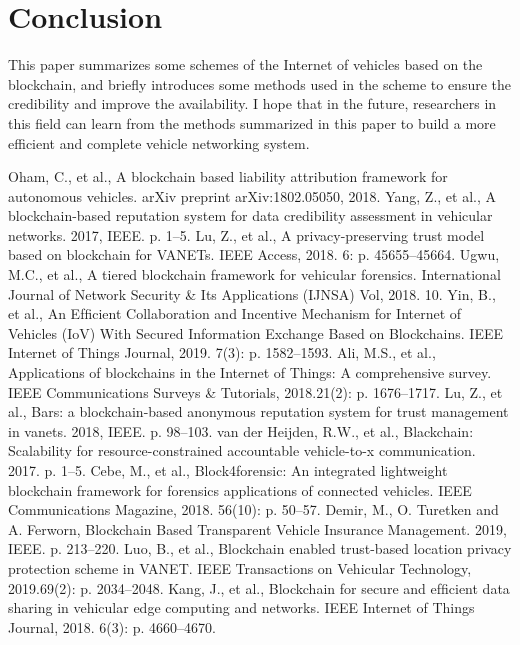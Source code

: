 \section{Conclusion}\label{sec:conclusion}
This paper summarizes some schemes of the Internet of vehicles based on the blockchain, and briefly introduces some methods used in the scheme to ensure the credibility and improve the availability. I hope that in the future, researchers in this field can learn from the methods summarized in this paper to build a more efficient and complete vehicle networking system.
\begin{thebibliography}{99} 
 Oham, C., et al., A blockchain based liability attribution framework for autonomous vehicles. arXiv preprint arXiv:1802.05050, 2018.
 Yang, Z., et al., A blockchain-based reputation system for data credibility assessment in vehicular networks. 2017, IEEE. p. 1–5.
 Lu, Z., et al., A privacy-preserving trust model based on blockchain for VANETs. IEEE Access, 2018. 6: p. 45655–45664.
 Ugwu, M.C., et al., A tiered blockchain framework for vehicular forensics. International Journal of Network Security \& Its Applications (IJNSA)
Vol, 2018. 10.
 Yin, B., et al., An Efﬁcient Collaboration and Incentive Mechanism for Internet of Vehicles (IoV) With Secured Information Exchange Based on Blockchains. IEEE Internet of Things Journal, 2019. 7(3): p. 1582–1593.
 Ali, M.S., et al., Applications of blockchains in the Internet of Things: A comprehensive survey. IEEE Communications Surveys \& Tutorials, 2018.21(2): p. 1676–1717.
 Lu, Z., et al., Bars: a blockchain-based anonymous reputation system for trust management in vanets. 2018, IEEE. p. 98–103.
 van der Heijden, R.W., et al., Blackchain: Scalability for resource-constrained accountable vehicle-to-x communication. 2017. p. 1–5.
 Cebe, M., et al., Block4forensic: An integrated lightweight blockchain framework for forensics applications of connected vehicles. IEEE Communications Magazine, 2018. 56(10): p. 50–57.
 Demir, M., O. Turetken and A. Ferworn, Blockchain Based Transparent Vehicle Insurance Management. 2019, IEEE. p. 213–220.
 Luo, B., et al., Blockchain enabled trust-based location privacy protection scheme in VANET. IEEE Transactions on Vehicular Technology, 2019.69(2): p. 2034–2048.
 Kang, J., et al., Blockchain for secure and efﬁcient data sharing in vehicular edge computing and networks. IEEE Internet of Things Journal, 2018. 6(3): p. 4660–4670.

\end{thebibliography}
